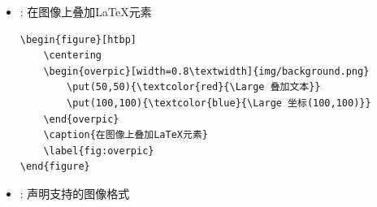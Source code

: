 \begin{itemize}
\begin{lstlisting}[style=mylatex]
    \hfill
    \begin{subfigure}[b]{0.3\textwidth}
        \texttt{[image: img/matrix2.png]}
        \caption{图2}
    \end{subfigure}
    \hfill
    \begin{subfigure}[b]{0.3\textwidth}
        \texttt{[image: img/matrix3.png]}
        \caption{图3}
    \end{subfigure}
    \caption{3×1图形矩阵示例}
    \label{fig:subfigmat}
\end{figure}
\end{lstlisting}
    \item \ilcode{\RequirePackage{overpic}}: 在图像上叠加LaTeX元素
\begin{lstlisting}[style=myshell]
%% 图上叠加文本
\begin{figure}[htbp]
    \centering
    \begin{overpic}[width=0.8\textwidth]{img/background.png}
        \put(50,50){\textcolor{red}{\Large 叠加文本}}
        \put(100,100){\textcolor{blue}{\Large 坐标(100,100)}}
    \end{overpic}
    \caption{在图像上叠加LaTeX元素}
    \label{fig:overpic}
\end{figure}
\end{lstlisting}
    \item {}: 声明支持的图像格式
\end{itemize}






